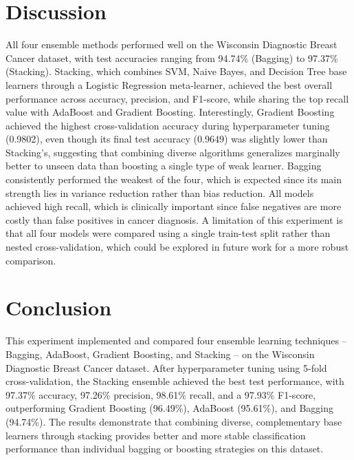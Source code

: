 \documentclass[12pt,a4paper]{article}
\begin{document}
\section{Discussion}
All four ensemble methods performed well on the Wisconsin Diagnostic Breast Cancer dataset, with test accuracies ranging from 94.74\% (Bagging) to 97.37\% (Stacking). Stacking, which combines SVM, Naive Bayes, and Decision Tree base learners through a Logistic Regression meta-learner, achieved the best overall performance across accuracy, precision, and F1-score, while sharing the top recall value with AdaBoost and Gradient Boosting. Interestingly, Gradient Boosting achieved the highest cross-validation accuracy during hyperparameter tuning (0.9802), even though its final test accuracy (0.9649) was slightly lower than Stacking's, suggesting that combining diverse algorithms generalizes marginally better to unseen data than boosting a single type of weak learner. Bagging consistently performed the weakest of the four, which is expected since its main strength lies in variance reduction rather than bias reduction. All models achieved high recall, which is clinically important since false negatives are more costly than false positives in cancer diagnosis. A limitation of this experiment is that all four models were compared using a single train-test split rather than nested cross-validation, which could be explored in future work for a more robust comparison.

\section{Conclusion}
This experiment implemented and compared four ensemble learning techniques -- Bagging, AdaBoost, Gradient Boosting, and Stacking -- on the Wisconsin Diagnostic Breast Cancer dataset. After hyperparameter tuning using 5-fold cross-validation, the Stacking ensemble achieved the best test performance, with 97.37\% accuracy, 97.26\% precision, 98.61\% recall, and a 97.93\% F1-score, outperforming Gradient Boosting (96.49\%), AdaBoost (95.61\%), and Bagging (94.74\%). The results demonstrate that combining diverse, complementary base learners through stacking provides better and more stable classification performance than individual bagging or boosting strategies on this dataset.
\end{document}
